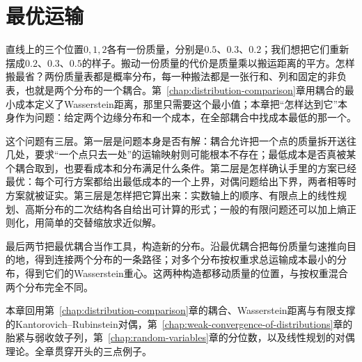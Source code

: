 \chapter{最优运输}
\label{chap:optimal-transport}

直线上的三个位置$0,1,2$各有一份质量，分别是$0.5$、$0.3$、$0.2$；我们想把它们重新摆成$0.2$、$0.3$、$0.5$的样子。搬动一份质量的代价是质量乘以搬运距离的平方。怎样搬最省？两份质量表都是概率分布，每一种搬法都是一张行和、列和固定的非负表，也就是两个分布的一个耦合。第~\ref{chap:distribution-comparison}章用耦合的最小成本定义了Wasserstein距离，那里只需要这个最小值；本章把“怎样达到它”本身作为问题：给定两个边缘分布和一个成本，在全部耦合中找成本最低的那一个。

这个问题有三层。第一层是问题本身是否有解：耦合允许把一个点的质量拆开送往几处，要求“一个点只去一处”的运输映射则可能根本不存在；最低成本是否真被某个耦合取到，也要看成本和分布满足什么条件。第二层是怎样确认手里的方案已经最优：每个可行方案都给出最低成本的一个上界，对偶问题给出下界，两者相等时方案就被证实。第三层是怎样把它算出来：实数轴上的顺序、有限点上的线性规划、高斯分布的二次结构各自给出可计算的形式；一般的有限问题还可以加上熵正则化，用简单的交替缩放求近似解。

最后两节把最优耦合当作工具，构造新的分布。沿最优耦合把每份质量匀速推向目的地，得到连接两个分布的一条路径；对多个分布按权重求总运输成本最小的分布，得到它们的Wasserstein重心。这两种构造都移动质量的位置，与按权重混合两个分布完全不同。

本章回用第~\ref{chap:distribution-comparison}章的耦合、Wasserstein距离与有限支撑的Kantorovich--Rubinstein对偶，第~\ref{chap:weak-convergence-of-distributions}章的胎紧与弱收敛子列，第~\ref{chap:random-variables}章的分位数，以及线性规划的对偶理论。全章贯穿开头的三点例子。








